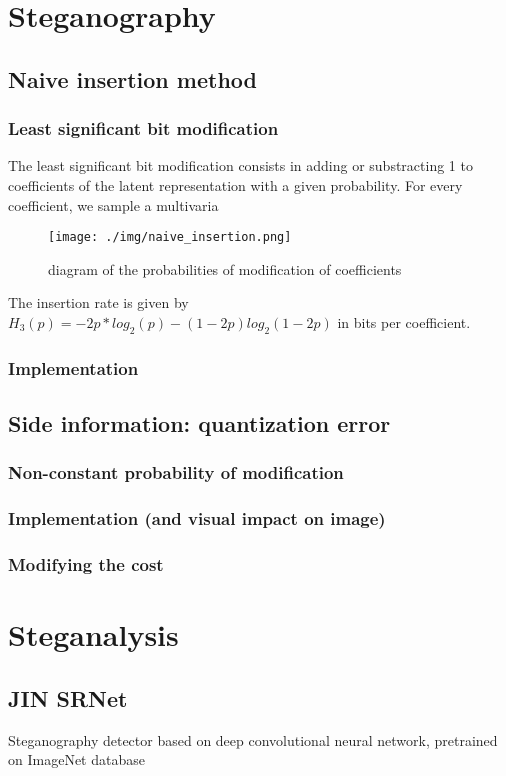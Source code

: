 \documentclass[12pt]{article}
\begin{document}
\section{Steganography}
\subsection{Naive insertion method}
\subsubsection{Least significant bit modification}
The least significant bit modification consists in adding or substracting 1 to coefficients of the latent representation with a given probability. For every coefficient, we sample a multivaria
\begin{figure}[H]
    \centering
    \texttt{[image: ./img/naive\_insertion.png]}
    \caption[short]{diagram of the probabilities of modification of coefficients}
\end{figure}
The insertion rate is given by $H_3(p) = -2p*log_2(p) - (1-2p)log_2(1-2p)$ in bits per coefficient.
\subsubsection{Implementation}

\subsection{Side information: quantization error}
\subsubsection{Non-constant probability of modification}
\subsubsection{Implementation (and visual impact on image)}
\subsubsection{Modifying the cost}

\section{Steganalysis}
\subsection{JIN SRNet}
Steganography detector based on deep convolutional neural network, pretrained on ImageNet database
\end{document}
